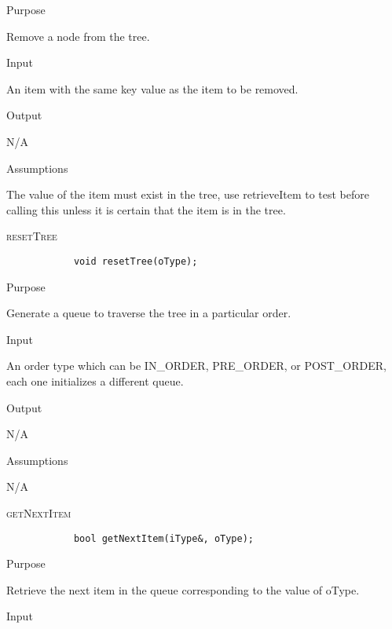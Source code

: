 \documentclass[pdftex, 12pt]{article}
\begin{document}
\begin{description}
\begin{description}
			\item{Purpose}

				Remove a node from the tree.

			\item{Input}

				An item with the same key value as the item to be removed.

			\item{Output}

				N/A

			\item{Assumptions}

				The value of the item must exist in the tree, use retrieveItem to test before calling this unless it is
				certain that the item is in the tree.

		\end{description}
	\item{\textsc{resetTree}}
		\begin{lstlisting}
			void resetTree(oType);
		\end{lstlisting}
		\begin{description}

			\item{Purpose}

				Generate a queue to traverse the tree in a particular order.

			\item{Input}

				An order type which can be IN\_ORDER, PRE\_ORDER, or POST\_ORDER, each one initializes a different
				queue.

			\item{Output}

				N/A

			\item{Assumptions}

				N/A

		\end{description}
	\item{\textsc{getNextItem}}
		\begin{lstlisting}
			bool getNextItem(iType&, oType);
		\end{lstlisting}
		\begin{description}

			\item{Purpose}

				Retrieve the next item in the queue corresponding to the value of oType.

			\item{Input}


\end{description}
\end{description}
\end{document}
